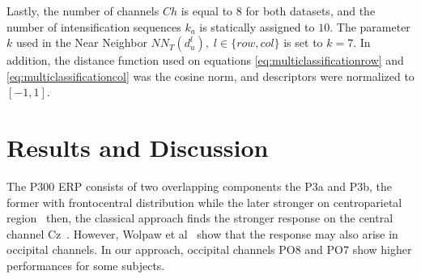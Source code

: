 \documentclass[entropy,article,submit,moreauthors,pdftex,10pt,a4paper]{mdpi}
\begin{document}
Lastly, the number of channels $Ch$ is equal to $8$ for both datasets, and the number of intensification sequences $k_a$ is statically assigned to $10$.  The parameter $k$ used in the Near Neighbor $NN_T(d^l_u), \;l\in\{row,{col}\}$ is set to $k=7$.  In addition, the distance function used on  equations \ref{eq:multiclassificationrow} and \ref{eq:multiclassificationcol} was the cosine norm, and descriptors were normalized to $ \left[ -1, 1 \right] $.

\section{Results and Discussion} \label{Results}
\label{section:results}

%

The P300 ERP  consists of two overlapping components the P3a and P3b, the former with frontocentral distribution while the later stronger on centroparietal region~\citep{Polich2007} then, the classical approach finds the stronger response on the central channel Cz~\citep{Riccio2013}. However, Wolpaw et al~\citep{Krusienski2006} show that the response may also arise in occipital channels.  In our approach, occipital channels PO8 and PO7 show higher performances for some subjects. %
\end{document}
